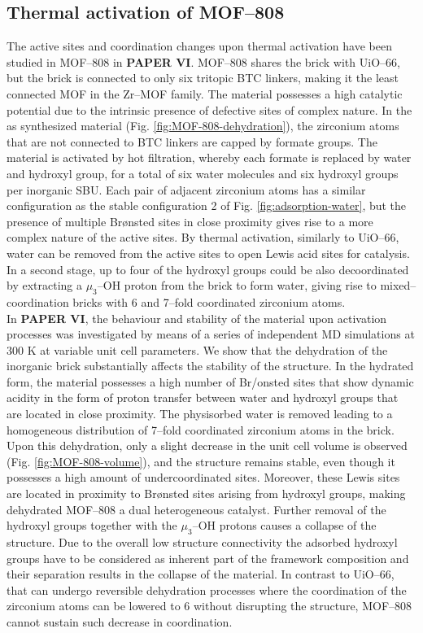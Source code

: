 \subsection{Thermal activation of MOF--808}
The active sites and coordination changes upon thermal activation have been studied in MOF--808 in \textbf{PAPER VI}. MOF--808 shares the  brick with UiO--66, but the brick is connected to only six tritopic BTC linkers, making it the least connected MOF in the Zr--MOF family. The material possesses a high catalytic potential due to the intrinsic presence of defective sites of complex nature.  In the as synthesized material (Fig. \ref{fig:MOF-808-dehydration}), the zirconium atoms that are not connected to BTC linkers are capped by formate groups. The material is activated by hot filtration, whereby each formate is replaced by water and hydroxyl group, for a total of six water molecules and six hydroxyl groups per inorganic SBU. Each pair of adjacent zirconium atoms has a similar configuration as the stable configuration 2 of Fig. \ref{fig:adsorption-water}, but the presence of multiple Br\o{}nsted sites in close proximity gives rise to a more complex nature of the active sites. By thermal activation, similarly to UiO--66, water can be removed from the active sites to open Lewis acid sites for catalysis. In a second stage, up to four of the hydroxyl groups could be also decoordinated by extracting a $\mu_3$--OH proton from the brick to form water, giving rise to mixed--coordination bricks with 6 and 7--fold coordinated zirconium atoms. \\
In \textbf{PAPER VI}, the behaviour and stability of the material upon activation processes was investigated by means of a series of independent MD simulations at 300 K at variable unit cell parameters. We show that the dehydration of the inorganic brick substantially affects the stability of the structure. In the hydrated form, the material possesses a high number of Br/o{}nsted sites that show dynamic acidity in the form of proton transfer between water and hydroxyl groups that are located in close proximity. The physisorbed water is removed leading to a homogeneous distribution of 7--fold coordinated zirconium atoms in the brick. Upon this dehydration, only a slight decrease in the unit cell volume is observed (Fig. \ref{fig:MOF-808-volume}), and the structure remains stable, even though it possesses a high amount of undercoordinated sites. Moreover, these Lewis sites are located in proximity to Br\o{}nsted sites arising from hydroxyl groups, making dehydrated MOF--808 a dual heterogeneous catalyst. Further removal of the hydroxyl groups together with the $\mu_3$--OH protons causes a collapse of the structure. Due to the overall low structure connectivity the adsorbed hydroxyl groups have to be considered as inherent part of the framework composition and their separation results in the collapse of the material. In contrast to UiO--66, that can undergo reversible dehydration processes where the coordination of the zirconium atoms can be lowered to 6 without disrupting the structure, MOF--808 cannot sustain such decrease in coordination.

